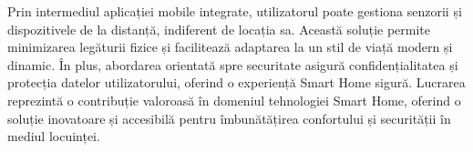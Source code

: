 Prin intermediul aplicației mobile integrate, utilizatorul poate gestiona senzorii și dispozitivele de la distanță, indiferent de locația sa. Această soluție permite minimizarea legăturii fizice și facilitează adaptarea la un stil de viață modern și dinamic. În plus, abordarea orientată spre securitate asigură confidențialitatea și protecția datelor utilizatorului, oferind o experiență Smart Home sigură. Lucrarea reprezintă o contribuție valoroasă în domeniul tehnologiei Smart Home, oferind o soluție inovatoare și accesibilă pentru îmbunătățirea confortului și securității în mediul locuinței.